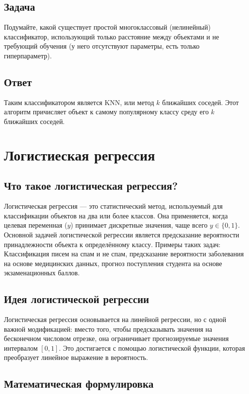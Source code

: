 \begin{itemize}
\subsection*{Задача}

Подумайте, какой существует простой многоклассовый (нелинейный) классификатор, использующий только расстояние между объектами и не требующий обучения (у него отсутствуют параметры, есть только гиперпараметр).

\subsection*{Ответ}

Таким классификатором является KNN, или метод $k$ ближайших соседей. Этот алгоритм причисляет объект к самому популярному классу среду его $k$ ближайших соседей.

\section{Логистиеская регрессия}
\subsection*{Что такое логистическая регрессия?}

Логистическая регрессия — это статистический метод, используемый для классификации объектов на два или более классов. Она применяется, когда целевая переменная (\(y\)) принимает дискретные значения, чаще всего \(y \in \{0, 1\}\). Основной задачей логистической регрессии является предсказание вероятности принадлежности объекта к определённому классу.
 Примеры таких задач: Классификация писем на спам и не спам, предсказание вероятности заболевания на основе медицинских данных, прогноз поступления студента на основе экзаменационных баллов.

\subsection*{Идея логистической регрессии}

Логистическая регрессия основывается на линейной регрессии, но с одной важной модификацией: вместо того, чтобы предсказывать значения на бесконечном числовом отрезке, она ограничивает прогнозируемые значения интервалом \([0, 1]\). Это достигается с помощью логистической функции, которая преобразует линейное выражение в вероятность.


\subsection*{Математическая формулировка}



\end{itemize}
